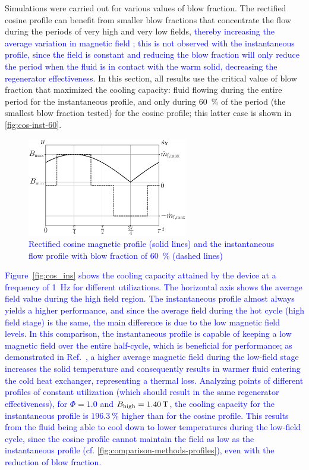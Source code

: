 \documentclass[referee]{svjour3}
\begin{document}
Simulations were carried out for various values of blow fraction. The rectified cosine profile can benefit from smaller blow fractions that concentrate the flow during the periods of very high and very low fields, \textcolor{blue}{thereby increasing the average variation in magnetic field \cite{bib:nakashima18-influen-exp}; this is not observed with the instantaneous profile, since the field is constant and reducing the blow fraction will only reduce the period when the fluid is in contact with the warm  solid, decreasing the regenerator effectiveness}. In this section, all results use the critical value of blow fraction that maximized the cooling capacity: fluid flowing during the entire period for the instantaneous profile, and only during \SI{60}{\percent} of the period (the smallest blow fraction tested) for the cosine profile; this latter case is shown in \autoref{fig:cos-inst-60}.

\begin{figure}[!ht]
  \centering
  \includegraphics[width=7cm]{Fig6-profiles_rc_and_flow_instantaneous}
  \caption{\textcolor{blue}{Rectified cosine magnetic profile (solid lines) and the instantaneous flow profile  with blow fraction of \SI{60}{\percent} (dashed lines)}}
  \label{fig:cos-inst-60}
\end{figure}

\textcolor{blue}{Figure~\ref{fig:cos_ins} shows the cooling capacity attained by the device at a frequency of \SI{1}{\hertz} for different utilizations. The horizontal axis shows the average field value during the high field region. The instantaneous profile almost always yields a higher performance, and since the average field during the hot cycle (high field stage) is the same, the main difference is due to the low magnetic field levels. In this comparison, the instantaneous profile is capable of keeping a low magnetic field over the entire half-cycle, which is beneficial for performance; as demonstrated in Ref.~\cite{bib:asme-mce}, a higher average magnetic field during the low-field stage increases the solid temperature and consequently results in  warmer fluid entering the cold heat exchanger, representing a thermal loss. Analyzing points of different profiles of constant utilization (which should result in the same regenerator effectiveness), 
 for $\Phi=1.0$ and $B_{\mathrm{high}} = \SI{1.40}{\tesla}$, the cooling capacity for the instantaneous profile is $\SI{196.3}{\percent}$ higher than for the cosine profile. This results from the fluid being able to cool down to lower temperatures during the low-field cycle, since the cosine profile cannot maintain the field as low as the instantaneous profile (cf. \autoref{fig:comparison-methods-profiles}), even with the reduction of blow fraction.}
\end{document}
